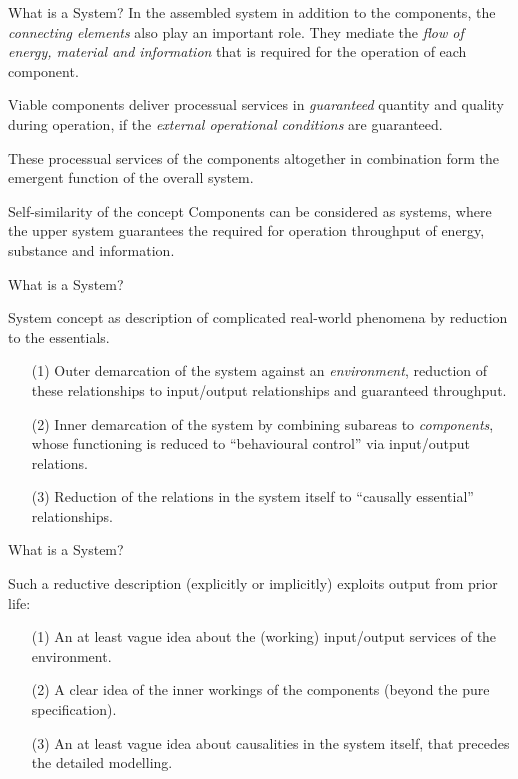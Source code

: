 \documentclass{beamer}
\begin{document}
\begin{frame}{What is a System?}
In the assembled system in addition to the components, the \emph{connecting
  elements} also play an important role.  They mediate the \emph{flow of
  energy, material and information} that is required for the operation of each
component.

\begin{block}{}
  Viable components deliver processual services in \emph{guaranteed} quantity
  and quality during operation, if the \emph{external operational conditions}
  are guaranteed.
\end{block}

These processual services of the components altogether in combination form the
emergent function of the overall system.

\begin{block}{Self-similarity of the concept}
  Components can be considered as systems, where the upper system guarantees
  the required for operation throughput of energy, substance and information.
\end{block}
\end{frame}

\begin{frame}{What is a System?}
  \begin{block}{
    System concept as description of complicated real-world phenomena by
    reduction to the essentials.}
    \begin{itemize}
    \item[(1)] Outer demarcation of the system against an \emph{environment},
      reduction of these relationships to input/output relationships and
      guaranteed throughput.
    \item[(2)] Inner demarcation of the system by combining subareas to
      \emph{components}, whose functioning is reduced to “behavioural control” via
      input/output relations.
    \item[(3)] Reduction of the relations in the system itself to “causally
      essential” relationships.
    \end{itemize}
  \end{block}

\end{frame}

\begin{frame}{What is a System?}
  \begin{block}{
    Such a reductive description (explicitly or implicitly) exploits output from
    prior life:}
    \begin{itemize}
    \item[(1)] An at least vague idea about the (working) input/output services of
      the environment.
    \item[(2)] A clear idea of the inner workings of the components (beyond the
      pure specification).
    \item[(3)] An at least vague idea about causalities in the system itself, that
      precedes the detailed modelling.
    \end{itemize}
  \end{block}

\end{frame}
\end{document}
